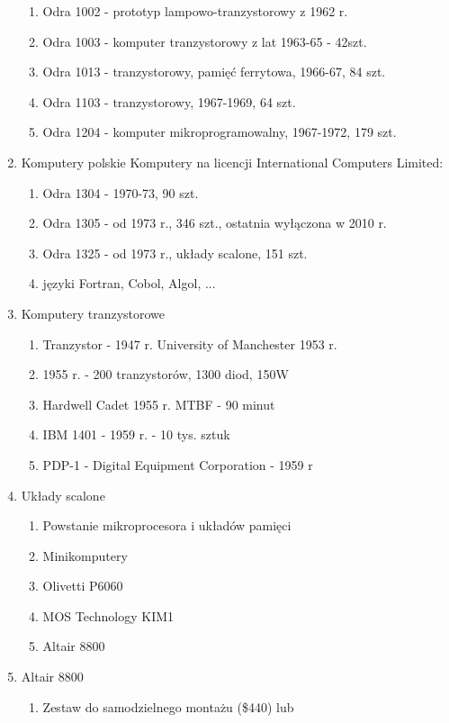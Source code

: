 \documentclass[a4paper,twoside,onecolumn]{report}
\begin{document}
\begin{enumerate}[-]
\begin{enumerate}[*]
					\item Odra 1002 - prototyp lampowo-tranzystorowy z 1962 r.
					\item Odra 1003 - komputer tranzystorowy z lat 1963-65 - 42szt.
					\item Odra 1013 - tranzystorowy, pamięć ferrytowa, 1966-67, 84 szt.
					\item Odra 1103 - tranzystorowy, 1967-1969, 64 szt. 
					\item Odra 1204 - komputer mikroprogramowalny, 1967-1972, 179 szt.
				\end{enumerate}
			\item Komputery polskie Komputery na licencji International Computers Limited:
				\begin{enumerate}[*]
					\item Odra 1304 - 1970-73, 90 szt.
					\item Odra 1305 - od 1973 r., 346 szt., ostatnia wyłączona w 2010 r.
					\item Odra 1325 - od 1973 r., układy scalone, 151 szt. 
					\item języki Fortran, Cobol, Algol, ...
				\end{enumerate}
			\item Komputery tranzystorowe
				\begin{enumerate}[*]
					\item Tranzystor - 1947 r. University of Manchester 1953 r.
					\item 1955 r. - 200 tranzystorów, 1300 diod, 150W
					\item Hardwell Cadet 1955 r. MTBF - 90 minut 
					\item IBM 1401 - 1959 r. - 10 tys. sztuk
					\item PDP-1 - Digital Equipment Corporation - 1959 r
				\end{enumerate}
			\item Układy scalone
				\begin{enumerate}[*]
					\item Powstanie mikroprocesora i układów pamięci
					\item Minikomputery
					\item Olivetti P6060
					\item MOS Technology KIM1
					\item Altair 8800
				\end{enumerate}
			\item Altair 8800
				\begin{enumerate}[*]
					\item Zestaw do samodzielnego montażu (\$440) lub

\end{enumerate}
\end{enumerate}
\end{document}
